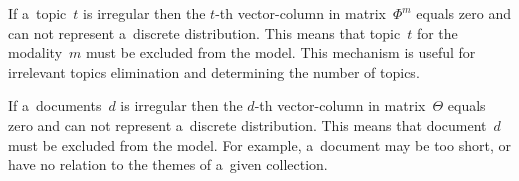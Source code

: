 \documentclass{llncs}
\begin{document}
\begin{note}
    If a~topic~$t$ is irregular
    then the $t$-th vector-column in matrix~$\Phi^m$ equals zero
    and can not represent a~discrete distribution.
    This means that topic~$t$ for the modality~$m$ must be excluded from the model.
    This mechanism is useful for irrelevant topics elimination and determining the number of topics.
\end{note}
\begin{note}
    If a~documents~$d$ is irregular
    then the $d$-th vector-column in matrix~$\Theta$ equals zero
    and can not represent a~discrete distribution.
    This means that document~$d$ must be excluded from the model.
    For example, a~document may be too short, or have no relation to the themes of a~given collection.
\end{note}
\end{document}
